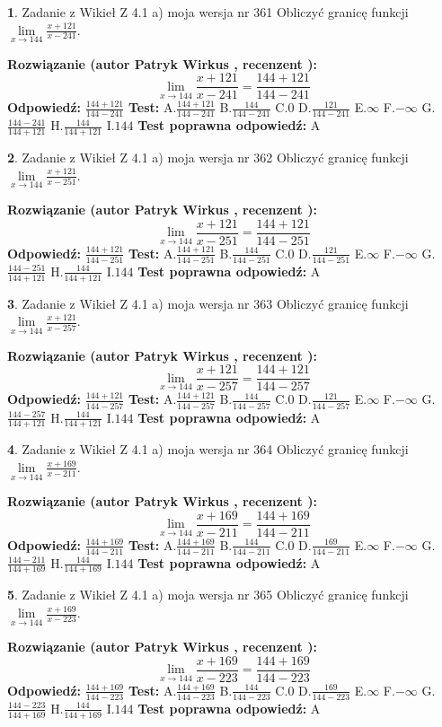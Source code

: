 \documentclass[12pt, a4paper]{article}
\theoremstyle{definition} %
\newtheorem{zad}{}
\newcommand{\zadStart}[1]{\begin{zad}#1\newline}
\newcommand{\zadStop}{\end{zad}}
\newcommand{\rozwStart}[2]{\noindent \textbf{Rozwiązanie (autor #1 , recenzent #2): }\newline}
\newcommand{\rozwStop}{\newline}
\newcommand{\odpStart}{\noindent \textbf{Odpowiedź:}\newline}
\newcommand{\odpStop}{\newline}
\newcommand{\testStart}{\noindent \textbf{Test:}\newline}
\newcommand{\testStop}{\newline}
\newcommand{\kluczStart}{\noindent \textbf{Test poprawna odpowiedź:}\newline}
\newcommand{\kluczStop}{\newline}
\begin{document}
\zadStart{Zadanie z Wikieł Z 4.1 a) moja wersja nr 361}
Obliczyć granicę funkcji $\lim\limits_{x\to144}\frac{x+121}{x-241}$.
\zadStop
\rozwStart{Patryk Wirkus}{}
$$\lim\limits_{x\to144}\frac{x+121}{x-241} = \frac{144+121}{144-241}$$
\rozwStop
\odpStart
$\frac{144+121}{144-241}$
\odpStop
\testStart
A.$\frac{144+121}{144-241}$
B.$\frac{144}{144-241}$
C.$0$
D.$\frac{121}{144-241}$
E.$\infty$
F.$-\infty$
G.$\frac{144-241}{144+121}$
H.$\frac{144}{144+121}$
I.$144$
\testStop
\kluczStart
A
\kluczStop



\zadStart{Zadanie z Wikieł Z 4.1 a) moja wersja nr 362}
Obliczyć granicę funkcji $\lim\limits_{x\to144}\frac{x+121}{x-251}$.
\zadStop
\rozwStart{Patryk Wirkus}{}
$$\lim\limits_{x\to144}\frac{x+121}{x-251} = \frac{144+121}{144-251}$$
\rozwStop
\odpStart
$\frac{144+121}{144-251}$
\odpStop
\testStart
A.$\frac{144+121}{144-251}$
B.$\frac{144}{144-251}$
C.$0$
D.$\frac{121}{144-251}$
E.$\infty$
F.$-\infty$
G.$\frac{144-251}{144+121}$
H.$\frac{144}{144+121}$
I.$144$
\testStop
\kluczStart
A
\kluczStop



\zadStart{Zadanie z Wikieł Z 4.1 a) moja wersja nr 363}
Obliczyć granicę funkcji $\lim\limits_{x\to144}\frac{x+121}{x-257}$.
\zadStop
\rozwStart{Patryk Wirkus}{}
$$\lim\limits_{x\to144}\frac{x+121}{x-257} = \frac{144+121}{144-257}$$
\rozwStop
\odpStart
$\frac{144+121}{144-257}$
\odpStop
\testStart
A.$\frac{144+121}{144-257}$
B.$\frac{144}{144-257}$
C.$0$
D.$\frac{121}{144-257}$
E.$\infty$
F.$-\infty$
G.$\frac{144-257}{144+121}$
H.$\frac{144}{144+121}$
I.$144$
\testStop
\kluczStart
A
\kluczStop



\zadStart{Zadanie z Wikieł Z 4.1 a) moja wersja nr 364}
Obliczyć granicę funkcji $\lim\limits_{x\to144}\frac{x+169}{x-211}$.
\zadStop
\rozwStart{Patryk Wirkus}{}
$$\lim\limits_{x\to144}\frac{x+169}{x-211} = \frac{144+169}{144-211}$$
\rozwStop
\odpStart
$\frac{144+169}{144-211}$
\odpStop
\testStart
A.$\frac{144+169}{144-211}$
B.$\frac{144}{144-211}$
C.$0$
D.$\frac{169}{144-211}$
E.$\infty$
F.$-\infty$
G.$\frac{144-211}{144+169}$
H.$\frac{144}{144+169}$
I.$144$
\testStop
\kluczStart
A
\kluczStop



\zadStart{Zadanie z Wikieł Z 4.1 a) moja wersja nr 365}
Obliczyć granicę funkcji $\lim\limits_{x\to144}\frac{x+169}{x-223}$.
\zadStop
\rozwStart{Patryk Wirkus}{}
$$\lim\limits_{x\to144}\frac{x+169}{x-223} = \frac{144+169}{144-223}$$
\rozwStop
\odpStart
$\frac{144+169}{144-223}$
\odpStop
\testStart
A.$\frac{144+169}{144-223}$
B.$\frac{144}{144-223}$
C.$0$
D.$\frac{169}{144-223}$
E.$\infty$
F.$-\infty$
G.$\frac{144-223}{144+169}$
H.$\frac{144}{144+169}$
I.$144$
\testStop
\kluczStart
A
\kluczStop
\end{document}
